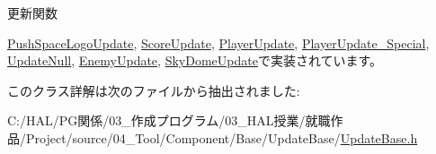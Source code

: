 更新関数 



\mbox{\hyperlink{class_push_space_logo_update_aa07fe6f6f4f072e1f81bc6708dd4727e}{Push\+Space\+Logo\+Update}}, \mbox{\hyperlink{class_score_update_aae2b398784079a651ed92eb4c634b1c9}{Score\+Update}}, \mbox{\hyperlink{class_player_update_af6e1b8ca60399f232e64d2acb4968c75}{Player\+Update}}, \mbox{\hyperlink{class_player_update___special_afef3503e292dbaded809068fd87deadd}{Player\+Update\+\_\+\+Special}}, \mbox{\hyperlink{class_update_null_a692f4f34e4ef35ca286a1d3606fdf473}{Update\+Null}}, \mbox{\hyperlink{class_enemy_update_ae9662f3a2d064dc69c0d68293e60f051}{Enemy\+Update}}, \mbox{\hyperlink{class_sky_dome_update_ae163cb90e4de561fe1f7b2cb311be331}{Sky\+Dome\+Update}}で実装されています。



このクラス詳解は次のファイルから抽出されました\+:\begin{DoxyCompactItemize}
\item 
C\+:/\+H\+A\+L/\+P\+G関係/03\+\_\+作成プログラム/03\+\_\+\+H\+A\+L授業/就職作品/\+Project/source/04\+\_\+\+Tool/\+Component/\+Base/\+Update\+Base/\mbox{\hyperlink{_update_base_8h}{Update\+Base.\+h}}\end{DoxyCompactItemize}
